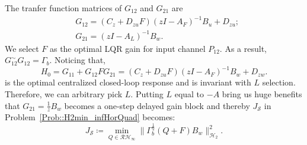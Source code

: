 The tranfer function matrices of \(G_{12}\) and \(G_{21}\) are
\begin{equation*}
\begin{split}
& G_{12} = (C_z + D_{zu} F) (zI-A_F)^{-1} B_u + D_{zu}; \\
& G_{21} = (zI-A_L)^{-1} B_w.
\end{split} 
\end{equation*}
We select \(F\) as the optimal LQR gain for input channel \(P_{12}\). As a result, \(G_{12}^\sim G_{12} = \Gamma_b\). Noticing that,
\[
H_0 = G_{11} + G_{12} F G_{21} = (C_z + D_{zu} F) (zI-A_F)^{-1} B_w + D_{zw}.
\]
is the optimal centralized closed-loop response and is invariant with \(L\) selection. Therefore, we can arbitrary pick \(L\). Putting \(L\) equal to \(-A\) bring us huge benefits that \(G_{21} = \frac{1}{z} B_w\) becomes a one-step delayed gain block and thereby \(J_\mathcal{S}\) in Problem~\ref{Prob::H2min_infHorQuad} becomes:
\begin{equation}
     J_\mathcal{S} \coloneqq \underset{Q\in\mathcal{RH}_\infty}{\min} \|\Gamma_b^{\frac{1}{2}}(Q + F) B_w\|_{\mathcal{H}_2}^2.
\end{equation}





